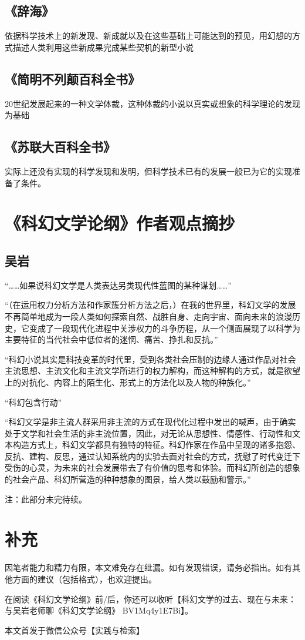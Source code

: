 \documentclass{ctexart}
\begin{document}
\subsection{《辞海》}

    依据科学技术上的新发现、新成就以及在这些基础上可能达到的预见，用幻想的方式描述人类利用这些新成果完成某些契机的新型小说



\subsection{《简明不列颠百科全书》}

    20世纪发展起来的一种文学体裁，这种体裁的小说以真实或想象的科学理论的发现为基础

\subsection{《苏联大百科全书》}

实际上还没有实现的科学发现和发明，但科学技术已有的发展一般已为它的实现准备了条件。

\section{《科幻文学论纲》作者观点摘抄}

\subsection{吴岩}
    “……如果说科幻文学是人类表达另类现代性蓝图的某种谋划……”

    “（在运用权力分析方法和作家簇分析方法之后，）在我的世界里，科幻文学的发展不再简单地成为一段人类如何探索自然、战胜自身、走向宇宙、面向未来的浪漫历史，它变成了一段现代化进程中关涉权力的斗争历程，从一个侧面展现了以科学为主要特征的当代社会中低位者的迷惘、痛苦、挣扎和反抗。”

    “科幻小说其实是科技变革的时代里，受到各类社会压制的边缘人通过作品对社会主流思想、主流文化和主流文学所进行的权力解构，而这种解构的方式，就是欲望上的对抗化、内容上的陌生化、形式上的方法化以及人物的种族化。”

    “科幻包含行动”

    “科幻文学是非主流人群采用非主流的方式在现代化过程中发出的喊声，由于确实处于文学和社会生活的非主流位置，因此，对无论从思想性、情感性、行动性和文本构造方式上，科幻文学都具有独特的特征。科幻作家在作品中呈现的诸多抱怨、反抗、建构、反思，通过认知系统内的实验去面对社会的方式，抚慰了时代变迁下受伤的心灵，为未来的社会发展带去了有价值的思考和体验。而科幻所创造的想象的社会产品、科幻所营造的种种想象的图景，给人类以鼓励和警示。”

    注：此部分未完待续。

\section{补充}

    因笔者能力和精力有限，本文难免存在纰漏。如有发现错误，请务必指出。如有其他方面的建议（包括格式），也欢迎提出。

    在阅读《科幻文学论纲》前/后，你还可以收听【科幻文学的过去、现在与未来：与吴岩老师聊《科幻文学论纲》 BV1Mq4y1E7Bi】。

    本文首发于微信公众号【实践与检索】
\end{document}
